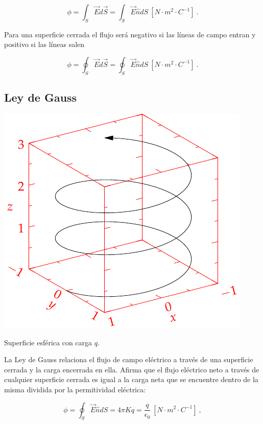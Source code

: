 \documentclass{tufte-handout}
\begin{document}
\begin{equation}
\phi = \int_S \vec{E}d\vec{S} = \int_S \vec{E}\hat{n}dS~[N\cdot m^2 \cdot C^{-1}]~.
\end{equation}

Para una superficie cerrada el flujo será negativo si las líneas de campo entran y positivo si las líneas salen

\begin{equation}
\phi = \oint_S \vec{E}d\vec{S} = \oint_S \vec{E}\hat{n}dS~[N\cdot m^2 \cdot C^{-1}]~.
\end{equation}

\subsection{Ley de Gauss}

\begin{marginfigure}%
    \includegraphics[width=\linewidth]{helix}
    \caption{Superficie esférica con carga $q$.}
    \label{fig:esferagauss}
\end{marginfigure}

La Ley de Gauss relaciona el flujo de campo eléctrico a través de una superficie cerrada y la carga encerrada en ella. Afirma que el flujo eléctrico neto a través de cualquier superficie cerrada es igual a la carga neta que se encuentre dentro de la misma dividida por la permitividad eléctrica:

\begin{equation}
\phi = \oint_S \vec{E}\hat{n}dS = 4\pi Kq = \frac{q}{\epsilon_0}~[N\cdot m^2 \cdot C^{-1}]~,
\end{equation}
\end{document}
